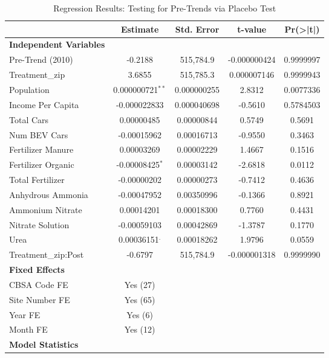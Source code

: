 \documentclass[12pt]{article}
\begin{document}
	\begin{table}[h]
		\centering
		\caption{Regression Results: Testing for Pre-Trends via Placebo Test}
		\label{tab:pre_trends}
		\begin{threeparttable}
			\begin{adjustbox}{max width=\textwidth}
				\begin{tabular}{l c c c c}
					\toprule
					& Estimate & Std. Error & t-value & Pr(>|t|) \\
					\midrule
					\textbf{Independent Variables} & & & & \\
					Pre-Trend (2010) & -0.2188 & 515,784.9 & -0.000000424 & 0.9999997 \\
					Treatment\_zip & 3.6855 & 515,785.3 & 0.000007146 & 0.9999943 \\
					Population & 0.000000721$^{**}$ & 0.000000255 & 2.8312 & 0.0077336 \\
					Income Per Capita & -0.000022833 & 0.000040698 & -0.5610 & 0.5784503 \\
					Total Cars & 0.00000485 & 0.00000844 & 0.5749 & 0.5691 \\
					Num BEV Cars & -0.00015962 & 0.00016713 & -0.9550 & 0.3463 \\
					Fertilizer Manure & 0.00003269 & 0.00002229 & 1.4667 & 0.1516 \\
					Fertilizer Organic & -0.00008425$^{*}$ & 0.00003142 & -2.6818 & 0.0112 \\
					Total Fertilizer & -0.00000202 & 0.00000273 & -0.7412 & 0.4636 \\
					Anhydrous Ammonia & -0.00047952 & 0.00350996 & -0.1366 & 0.8921 \\
					Ammonium Nitrate & 0.00014201 & 0.00018300 & 0.7760 & 0.4431 \\
					Nitrate Solution & -0.00059103 & 0.00042869 & -1.3787 & 0.1770 \\
					Urea & 0.00036151$^{.}$ & 0.00018262 & 1.9796 & 0.0559 \\
					Treatment\_zip:Post & -0.6797 & 515,784.9 & -0.000001318 & 0.9999990 \\
					\midrule
					\textbf{Fixed Effects} & & & & \\
					CBSA Code FE & Yes (27) & & & \\
					Site Number FE & Yes (65) & & & \\
					Year FE & Yes (6) & & & \\
					Month FE & Yes (12) & & & \\
					\midrule
					\textbf{Model Statistics} & & & & \\

\end{tabular}
\end{adjustbox}
\end{threeparttable}
\end{table}
\end{document}

